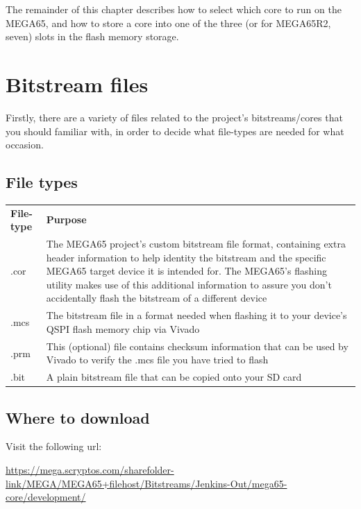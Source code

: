 The remainder of this chapter describes how to select which core to run on the MEGA65, and
how to store a core into one of the three (or for MEGA65R2, seven) slots in the flash memory storage.

\section{Bitstream files}
\label{sec:bitstreamfiles}

Firstly, there are a variety of files related to the project's bitstreams/cores that you should familiar with, in order to decide what file-types are needed for what occasion.

\subsection{File types}

\begin{center}
  \begin{longtable}{|R{2.2cm}|p{10cm}|}
  \hline
    {\textbf{File-type}} & {\textbf{Purpose}} \\
  \hhline{|=|=|}
  {.cor} & {The MEGA65 project's custom bitstream file format, containing extra header information to help identity the bitstream and the specific MEGA65 target device it is intended for. The MEGA65's flashing utility makes use of this additional information to assure you don't accidentally flash the bitstream of a different device} \\
  \hline
  {.mcs} & {The bitstream file in a format needed when flashing it to your device's QSPI flash memory chip via Vivado} \\
  \hline
  {.prm} & {This (optional) file contains checksum information that can be used by Vivado to verify the .mcs file you have tried to flash} \\
  \hline
  {.bit} & {A plain bitstream file that can be copied onto your SD card} \\
  \hline
  \end{longtable}
\end{center}

\subsection{Where to download}

Visit the following url:

\url{https://mega.scryptos.com/sharefolder-link/MEGA/MEGA65+filehost/Bitstreams/Jenkins-Out/mega65-core/development/}

